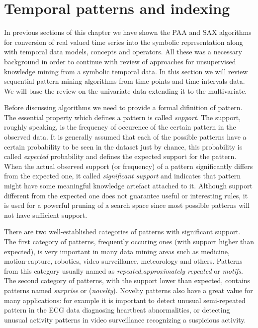 \section{Temporal patterns and indexing} \label{tpatterns}
In previous sections of this chapter we have shown the PAA and SAX algorithms for conversion of real valued time series into the symbolic representation along with temporal data models, concepts and operators. All these was a necessary background in order to continue with review of approaches for unsupervised knowledge mining from a symbolic temporal data. In this section we will review sequential pattern mining algorithms from time points and time-intervals data. We will base the review on the univariate data extending it to the multivariate.


Before discussing algorithms we need to provide a formal difinition of pattern. The essential property which defines a pattern is called \textit{support}. The support, roughly speaking, is the frequency of occurence of the certain pattern in the observed data. It is generally assumed that each of the possible patterns have a certain probability to be seen in the dataset just by chance, this probability is called \textit{expected} probability and defines the expected support for the pattern. When the actual observed support (or frequency) of a pattern significantly differs from the expected one, it called \textit{significant support} and indicates that pattern might have some meaningful knowledge artefact attached to it. Although support different from the expected one does not guarantee useful or interesting rules, it is used for a powerful pruning of a search space since most possible patterns will not have sufficient support.

There are two well-established categories of patterns with significant support. The first category of patterns, frequently occuring ones (with support higher than expected), is very important in many data mining areas such as medicine, motion-capture, robotics, video surveillance, meteorology and others. Patterns from this category usually named as \textit{repeated},\textit{approximately repeated} or \textit{motifs}. The second category of patterns, with the support lower than expected, contains patterns named \textit{surprise} or (\textit{novelty}). Novelty patterns also have a great value for many applications: for example it is important to detect unusual semi-repeated pattern in the ECG data diagnosing heartbeat abnormalities, or detecting unusual activity patterns in video surveillance recognizing a suspicious activity.

